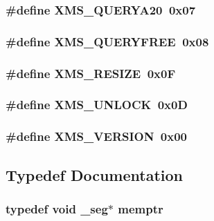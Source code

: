 \label{ID__MM_8H_ad8e0e5dae27baaec7b15b040b8e1307b}
\hypertarget{ID__MM_8H_a00db04c0ef3d8b55fd4ccaf3f797448d}{
\subsubsection[{XMS\_\-QUERYA20}]{\setlength{\rightskip}{0pt plus 5cm}\#define XMS\_\-QUERYA20~0x07}}
\label{ID__MM_8H_a00db04c0ef3d8b55fd4ccaf3f797448d}
\hypertarget{ID__MM_8H_ac1bc612b4603f6bdd25d762fc6eb1aed}{
\subsubsection[{XMS\_\-QUERYFREE}]{\setlength{\rightskip}{0pt plus 5cm}\#define XMS\_\-QUERYFREE~0x08}}
\label{ID__MM_8H_ac1bc612b4603f6bdd25d762fc6eb1aed}
\hypertarget{ID__MM_8H_aafba0a32b088f3f01e7ee16fea40e616}{
\subsubsection[{XMS\_\-RESIZE}]{\setlength{\rightskip}{0pt plus 5cm}\#define XMS\_\-RESIZE~0x0F}}
\label{ID__MM_8H_aafba0a32b088f3f01e7ee16fea40e616}
\hypertarget{ID__MM_8H_ad230314d8e4297b85e02c57f6df0511d}{
\subsubsection[{XMS\_\-UNLOCK}]{\setlength{\rightskip}{0pt plus 5cm}\#define XMS\_\-UNLOCK~0x0D}}
\label{ID__MM_8H_ad230314d8e4297b85e02c57f6df0511d}
\hypertarget{ID__MM_8H_a1bfcfd9911af188ce73f06cfbcee68a8}{
\subsubsection[{XMS\_\-VERSION}]{\setlength{\rightskip}{0pt plus 5cm}\#define XMS\_\-VERSION~0x00}}
\label{ID__MM_8H_a1bfcfd9911af188ce73f06cfbcee68a8}


\subsection{Typedef Documentation}
\hypertarget{ID__MM_8H_a04062decc7eb282b066c65e9137bb9bf}{
\subsubsection[{memptr}]{\setlength{\rightskip}{0pt plus 5cm}typedef void \_\-seg$\ast$ {\bf memptr}}}
\label{ID__MM_8H_a04062decc7eb282b066c65e9137bb9bf}


